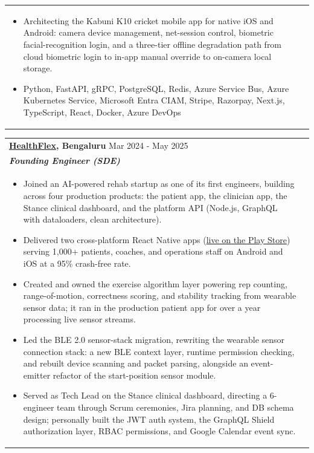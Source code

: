 \documentclass[a4paper,8pt]{article}
\begin{document}
\begin{tabularx}{\linewidth}{ @{}l r@{} }
\begin{minipage}[t]{\linewidth}
\begin{itemize}[nosep,after=\strut, leftmargin=2em, itemsep=2pt]
        \item Architecting the Kabuni K10 cricket mobile app for native iOS and Android: camera device management, net-session control, biometric facial-recognition login, and a three-tier offline degradation path from cloud biometric login to in-app manual override to on-camera local storage.
        \item Python, FastAPI, gRPC, PostgreSQL, Redis, Azure Service Bus, Azure Kubernetes Service, Microsoft Entra CIAM, Stripe, Razorpay, Next.js, TypeScript, React, Docker, Azure DevOps
    \end{itemize}
\end{minipage}
\end{tabularx}

\begin{tabularx}{\linewidth}{ @{}l r@{} }
\color[HTML]{1C033C} \textbf{{\href{https://www.healthflex.in/}{HealthFlex}, Bengaluru}} \hfill \color[HTML]{371e77} Mar 2024 - May 2025 \\[4pt]
\color[HTML]{371e77}\textbf{\textit{Founding Engineer (SDE)}}\ \hfill \color[HTML]{4B28A4} \\[5pt]
\begin{minipage}[t]{\linewidth}
    \begin{itemize}[nosep,after=\strut, leftmargin=2em, itemsep=2pt]
        \item Joined an AI-powered rehab startup as one of its first engineers, building across four production products: the patient app, the clinician app, the Stance clinical dashboard, and the platform API (Node.js, GraphQL with dataloaders, clean architecture).
        \item Delivered two cross-platform React Native apps (\href{https://play.google.com/store/apps/developer?id=HealthFlex}{live on the Play Store}) serving 1,000+ patients, coaches, and operations staff on Android and iOS at a 95\% crash-free rate.
        \item Created and owned the exercise algorithm layer powering rep counting, range-of-motion, correctness scoring, and stability tracking from wearable sensor data; it ran in the production patient app for over a year processing live sensor streams.
        \item Led the BLE 2.0 sensor-stack migration, rewriting the wearable sensor connection stack: a new BLE context layer, runtime permission checking, and rebuilt device scanning and packet parsing, alongside an event-emitter refactor of the start-position sensor module.
        \item Served as Tech Lead on the Stance clinical dashboard, directing a 6-engineer team through Scrum ceremonies, Jira planning, and DB schema design; personally built the JWT auth system, the GraphQL Shield authorization layer, RBAC permissions, and Google Calendar event sync.

\end{itemize}
\end{minipage}
\end{tabularx}
\end{document}
